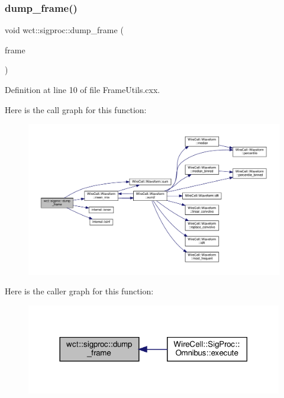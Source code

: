 \subsubsection{\texorpdfstring{dump\+\_\+frame()}{dump\_frame()}}
{\footnotesize\ttfamily void wct\+::sigproc\+::dump\+\_\+frame (\begin{DoxyParamCaption}\item[{\hyperlink{class_wire_cell_1_1_i_data_aff870b3ae8333cf9265941eef62498bc}{Wire\+Cell\+::\+I\+Frame\+::pointer}}]{frame }\end{DoxyParamCaption})}



Definition at line 10 of file Frame\+Utils.\+cxx.

Here is the call graph for this function\+:
\nopagebreak
\begin{figure}[H]
\begin{center}
\leavevmode
\includegraphics[width=350pt]{namespacewct_1_1sigproc_ad945dd464ab9a75f638922e67891daf3_cgraph}
\end{center}
\end{figure}
Here is the caller graph for this function\+:
\nopagebreak
\begin{figure}[H]
\begin{center}
\leavevmode
\includegraphics[width=317pt]{namespacewct_1_1sigproc_ad945dd464ab9a75f638922e67891daf3_icgraph}
\end{center}
\end{figure}
\mbox{\label{namespacewct_1_1sigproc_a51e6bea6697a8859f4ed81e2254412ab}} 
